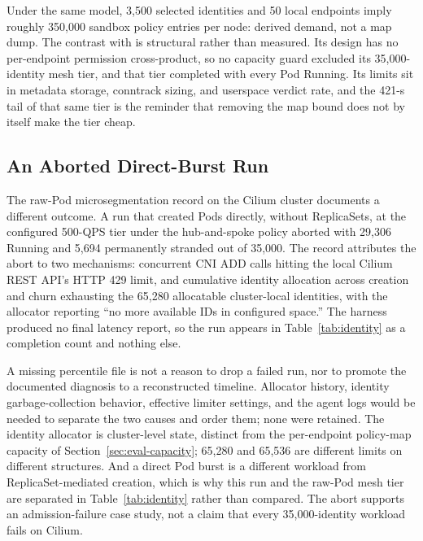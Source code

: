 Under the same model, 3,500 selected identities and 50 local endpoints
imply roughly 350,000 sandbox policy entries per node: derived demand,
not a map dump. The contrast with \sys{} is structural rather than
measured. Its design has no per-endpoint permission cross-product, so no
capacity guard excluded its 35,000-identity mesh tier, and that tier
completed with every Pod Running. Its limits sit in metadata storage,
conntrack sizing, and userspace verdict rate, and the 421-s tail of that
same tier is the reminder that removing the map bound does not by itself
make the tier cheap.

\subsection{An Aborted Direct-Burst Run}
\label{sec:eval-abort}
The raw-Pod microsegmentation record on the Cilium cluster documents a
different outcome. A run that created Pods directly, without
ReplicaSets, at the configured 500-QPS tier under the hub-and-spoke
policy aborted with 29,306 Running and 5,694 permanently stranded out of
35,000. The record attributes the abort to two mechanisms: concurrent
CNI ADD calls hitting the local Cilium REST API's HTTP 429 limit, and
cumulative identity allocation across creation and churn exhausting the
65,280 allocatable cluster-local identities, with the allocator
reporting ``no more available IDs in configured space.'' The harness
produced no final latency report, so the run appears in
Table~\ref{tab:identity} as a completion count and nothing else.

A missing percentile file is not a reason to drop a failed run, nor to
promote the documented diagnosis to a reconstructed timeline. Allocator
history, identity garbage-collection behavior, effective limiter
settings, and the agent logs would be needed to separate the two causes
and order them; none were retained. The identity allocator is
cluster-level state, distinct from the per-endpoint policy-map capacity
of Section~\ref{sec:eval-capacity}; 65,280 and 65,536 are different
limits on different structures. And a direct Pod burst is a different
workload from ReplicaSet-mediated creation, which is why this run and the
\sys{} raw-Pod mesh tier are separated in Table~\ref{tab:identity}
rather than compared. The abort supports an admission-failure case
study, not a claim that every 35,000-identity workload fails on Cilium.

